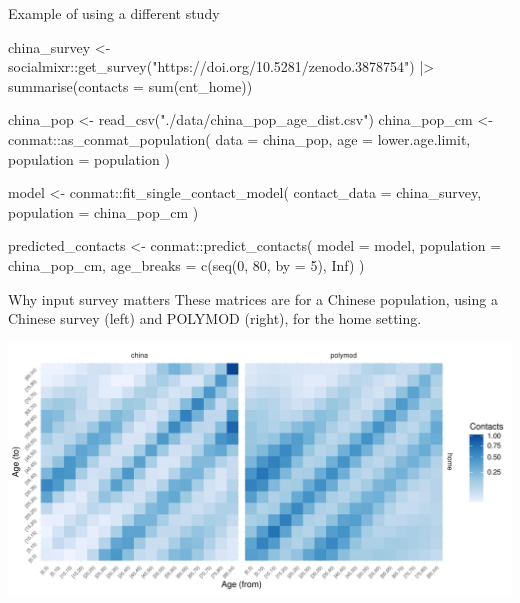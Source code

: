 \documentclass[
  14pt,
  ignorenonframetext,
  aspectratio=169,
]{beamer}
\newenvironment{Shaded}{\begin{snugshade}}{\end{snugshade}}
\newcommand{\AttributeTok}[1]{\textcolor[rgb]{0.40,0.45,0.13}{#1}}
\newcommand{\ConstantTok}[1]{\textcolor[rgb]{0.56,0.35,0.01}{#1}}
\newcommand{\DecValTok}[1]{\textcolor[rgb]{0.68,0.00,0.00}{#1}}
\newcommand{\FunctionTok}[1]{\textcolor[rgb]{0.28,0.35,0.67}{#1}}
\newcommand{\NormalTok}[1]{\textcolor[rgb]{0.00,0.23,0.31}{#1}}
\newcommand{\OtherTok}[1]{\textcolor[rgb]{0.00,0.23,0.31}{#1}}
\newcommand{\SpecialCharTok}[1]{\textcolor[rgb]{0.37,0.37,0.37}{#1}}
\newcommand{\StringTok}[1]{\textcolor[rgb]{0.13,0.47,0.30}{#1}}
\begin{document}
\begin{frame}[fragile]{Example of using a different study}
\label{example-of-using-a-different-study-1}
\begin{Shaded}
\begin{Highlighting}[]
\NormalTok{china\_survey }\OtherTok{\textless{}{-}}\NormalTok{ socialmixr}\SpecialCharTok{::}\FunctionTok{get\_survey}\NormalTok{(}\StringTok{"https://doi.org/10.5281/zenodo.3878754"}\NormalTok{) }\SpecialCharTok{|\textgreater{}}
    \FunctionTok{summarise}\NormalTok{(}\AttributeTok{contacts =} \FunctionTok{sum}\NormalTok{(cnt\_home))}

\NormalTok{china\_pop }\OtherTok{\textless{}{-}} \FunctionTok{read\_csv}\NormalTok{(}\StringTok{"./data/china\_pop\_age\_dist.csv"}\NormalTok{)}
\NormalTok{china\_pop\_cm }\OtherTok{\textless{}{-}}\NormalTok{ conmat}\SpecialCharTok{::}\FunctionTok{as\_conmat\_population}\NormalTok{(}
  \AttributeTok{data =}\NormalTok{ china\_pop,}
  \AttributeTok{age =}\NormalTok{ lower.age.limit,}
  \AttributeTok{population =}\NormalTok{ population}
\NormalTok{)}

\NormalTok{model }\OtherTok{\textless{}{-}}\NormalTok{ conmat}\SpecialCharTok{::}\FunctionTok{fit\_single\_contact\_model}\NormalTok{(}
    \AttributeTok{contact\_data =}\NormalTok{ china\_survey,}
    \AttributeTok{population =}\NormalTok{ china\_pop\_cm}
\NormalTok{)}

\NormalTok{predicted\_contacts }\OtherTok{\textless{}{-}}\NormalTok{ conmat}\SpecialCharTok{::}\FunctionTok{predict\_contacts}\NormalTok{(}
    \AttributeTok{model =}\NormalTok{ model,}
    \AttributeTok{population =}\NormalTok{ china\_pop\_cm,}
    \AttributeTok{age\_breaks =} \FunctionTok{c}\NormalTok{(}\FunctionTok{seq}\NormalTok{(}\DecValTok{0}\NormalTok{, }\DecValTok{80}\NormalTok{, }\AttributeTok{by =} \DecValTok{5}\NormalTok{), }\ConstantTok{Inf}\NormalTok{)}
\NormalTok{)}
\end{Highlighting}
\end{Shaded}
\end{frame}

\begin{frame}{Why input survey matters}
\label{why-input-survey-matters}
These matrices are for a Chinese population, using a Chinese survey
(left) and POLYMOD (right), for the home setting.

\begin{center}
\includegraphics{index_files/figure-beamer/unnamed-chunk-7-1.pdf}
\end{center}
\end{frame}
\end{document}
